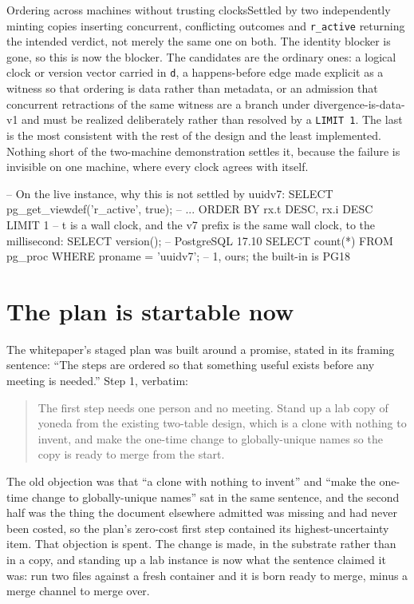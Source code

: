 \begin{Open}{Ordering across machines without trusting clocks}{Settled by two independently minting copies inserting concurrent, conflicting outcomes and \texttt{r\_active} returning the intended verdict, not merely the same one on both.}
The identity blocker is gone, so this is now the blocker. The candidates are the ordinary ones: a logical clock or version vector carried in \texttt{d}, a happens-before edge made explicit as a witness so that ordering is data rather than metadata, or an admission that concurrent retractions of the same witness are a branch under divergence-is-data-v1 and must be realized deliberately rather than resolved by a \texttt{LIMIT 1}. The last is the most consistent with the rest of the design and the least implemented. Nothing short of the two-machine demonstration settles it, because the failure is invisible on one machine, where every clock agrees with itself.
\begin{Check}
-- On the live instance, why this is not settled by uuidv7:
SELECT pg_get_viewdef('r_active', true);   -- ... ORDER BY rx.t DESC, rx.i DESC LIMIT 1
-- t is a wall clock, and the v7 prefix is the same wall clock, to the millisecond:
SELECT version();                                       -- PostgreSQL 17.10
SELECT count(*) FROM pg_proc WHERE proname = 'uuidv7';  -- 1, ours; the built-in is PG18
\end{Check}
\end{Open}

\section{The plan is startable now}

The whitepaper's staged plan was built around a promise, stated in its framing sentence: ``The steps are ordered so that something useful exists before any meeting is needed.'' Step 1, verbatim:

\begin{quote}
The first step needs one person and no meeting. Stand up a lab copy of yoneda from the existing two-table design, which is a clone with nothing to invent, and make the one-time change to globally-unique names so the copy is ready to merge from the start.
\end{quote}

The old objection was that ``a clone with nothing to invent'' and ``make the one-time change to globally-unique names'' sat in the same sentence, and the second half was the thing the document elsewhere admitted was missing and had never been costed, so the plan's zero-cost first step contained its highest-uncertainty item. That objection is spent. The change is made, in the substrate rather than in a copy, and standing up a lab instance is now what the sentence claimed it was: run two files against a fresh container and it is born ready to merge, minus a merge channel to merge over.

